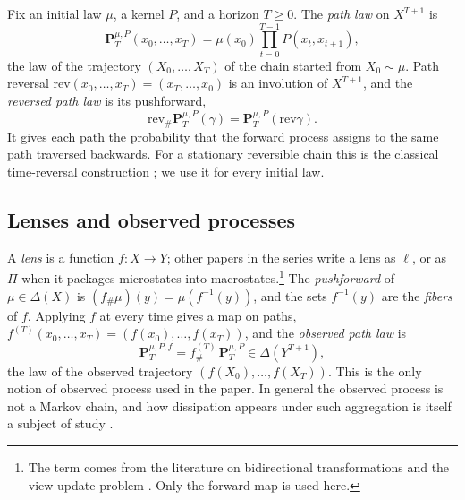 \documentclass[11pt]{article}
\theoremstyle{definition}
\newcommand{\rev}{\mathrm{rev}}
\newcommand{\1}{\mathbf{1}}
\begin{document}
Fix an initial law $\mu$, a kernel $P$, and a horizon $T\ge 0$.
The \emph{path law} on $X^{T+1}$ is
\[
  \mathbf{P}^{\mu,P}_T(x_0,\dots,x_T)=\mu(x_0)\prod_{t=0}^{T-1}P(x_t,x_{t+1}),
\]
the law of the trajectory $(X_0,\dots,X_T)$ of the chain started from $X_0\sim\mu$.
Path reversal $\rev(x_0,\dots,x_T)=(x_T,\dots,x_0)$ is an involution of $X^{T+1}$, and the \emph{reversed path law} is its pushforward,
\[
  \rev_{\#}\mathbf{P}^{\mu,P}_T(\gamma)=\mathbf{P}^{\mu,P}_T(\rev\gamma).
\]
It gives each path the probability that the forward process assigns to the same path traversed backwards.
For a stationary reversible chain this is the classical time-reversal construction \citep{Kelly1979}; we use it for every initial law.

\subsection{Lenses and observed processes}
A \emph{lens} is a function $f:X\to Y$; other papers in the series write a lens as $\ell$, or as $\Pi$ when it packages microstates into macrostates.\footnote{The term comes from the literature on bidirectional transformations and the view-update problem \citep{FosterEtAl2007}. Only the forward map is used here.}
The \emph{pushforward} of $\mu\in\Delta(X)$ is $(f_{\#}\mu)(y)=\mu(f^{-1}(y))$, and the sets $f^{-1}(y)$ are the \emph{fibers} of $f$.
Applying $f$ at every time gives a map on paths,
$f^{(T)}(x_0,\dots,x_T)=(f(x_0),\dots,f(x_T))$, and the \emph{observed path law} is
\[
  \mathbf{P}^{\mu,P,f}_T=f^{(T)}_{\#}\,\mathbf{P}^{\mu,P}_T\in\Delta(Y^{T+1}),
\]
the law of the observed trajectory $(f(X_0),\dots,f(X_T))$.
This is the only notion of observed process used in the paper.
In general the observed process is not a Markov chain, and how dissipation appears under such aggregation is itself a subject of study \citep{Esposito2012}.
\end{document}
